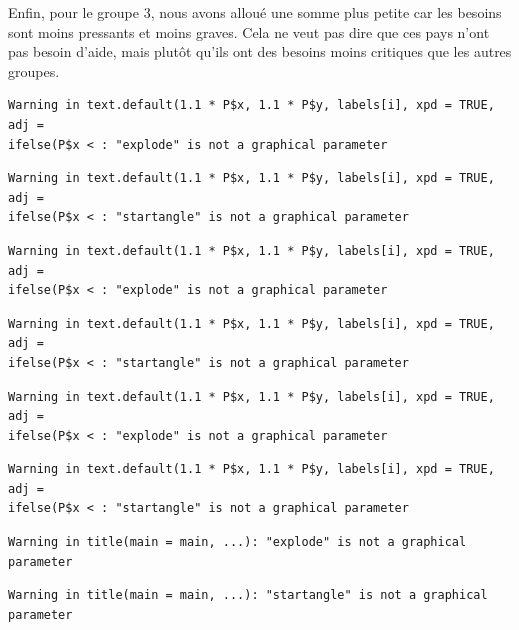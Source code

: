 \documentclass[
]{article}
\begin{document}
Enfin, pour le groupe 3, nous avons alloué une somme plus petite car les
besoins sont moins pressants et moins graves. Cela ne veut pas dire que
ces pays n'ont pas besoin d'aide, mais plutôt qu'ils ont des besoins
moins critiques que les autres groupes.

\begin{verbatim}
Warning in text.default(1.1 * P$x, 1.1 * P$y, labels[i], xpd = TRUE, adj =
ifelse(P$x < : "explode" is not a graphical parameter
\end{verbatim}

\begin{verbatim}
Warning in text.default(1.1 * P$x, 1.1 * P$y, labels[i], xpd = TRUE, adj =
ifelse(P$x < : "startangle" is not a graphical parameter
\end{verbatim}

\begin{verbatim}
Warning in text.default(1.1 * P$x, 1.1 * P$y, labels[i], xpd = TRUE, adj =
ifelse(P$x < : "explode" is not a graphical parameter
\end{verbatim}

\begin{verbatim}
Warning in text.default(1.1 * P$x, 1.1 * P$y, labels[i], xpd = TRUE, adj =
ifelse(P$x < : "startangle" is not a graphical parameter
\end{verbatim}

\begin{verbatim}
Warning in text.default(1.1 * P$x, 1.1 * P$y, labels[i], xpd = TRUE, adj =
ifelse(P$x < : "explode" is not a graphical parameter
\end{verbatim}

\begin{verbatim}
Warning in text.default(1.1 * P$x, 1.1 * P$y, labels[i], xpd = TRUE, adj =
ifelse(P$x < : "startangle" is not a graphical parameter
\end{verbatim}

\begin{verbatim}
Warning in title(main = main, ...): "explode" is not a graphical parameter
\end{verbatim}

\begin{verbatim}
Warning in title(main = main, ...): "startangle" is not a graphical parameter
\end{verbatim}
\end{document}

